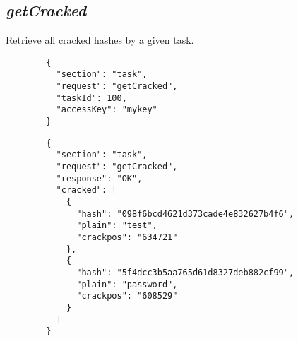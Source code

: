 \subsection*{\textit{getCracked}}
	Retrieve all cracked hashes by a given task.
	{
		\color{blue}
		\begin{verbatim}
		{
		  "section": "task",
		  "request": "getCracked",
		  "taskId": 100,
		  "accessKey": "mykey"
		}
		\end{verbatim}
	}
	{
		\color{OliveGreen}
		\begin{verbatim}
		{
		  "section": "task",
		  "request": "getCracked",
		  "response": "OK",
		  "cracked": [
		    {
		      "hash": "098f6bcd4621d373cade4e832627b4f6",
		      "plain": "test",
		      "crackpos": "634721"
		    },
		    {
		      "hash": "5f4dcc3b5aa765d61d8327deb882cf99",
		      "plain": "password",
		      "crackpos": "608529"
		    }
		  ]
		}
		\end{verbatim}
	}












